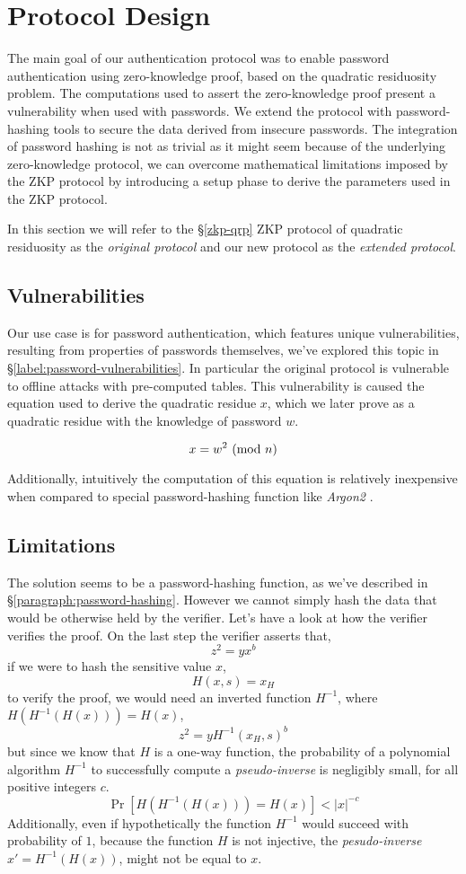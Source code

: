 \section{Protocol Design}
\label{label:protocol-design}
The main goal of our authentication protocol was to enable password authentication using zero-knowledge proof, based on the quadratic residuosity problem. 
The computations used to assert the zero-knowledge proof present a vulnerability when used with passwords.
We extend the protocol with password-hashing tools to secure the data derived from insecure passwords.
The integration of password hashing is not as trivial as it might seem because of the underlying zero-knowledge protocol, we can overcome mathematical limitations imposed by the ZKP protocol by introducing a setup phase to derive the parameters used in the ZKP protocol.

In this section we will refer to the \S\ref{zkp-qrp} ZKP protocol of quadratic residuosity as the \textit{original protocol}  and our new protocol as the \textit{extended protocol}.

\subsection{Vulnerabilities}
Our use case is for password authentication, which features unique vulnerabilities, resulting from properties of passwords themselves, we've explored this topic in \S \ref{label:password-vulnerabilities}.
In particular the original protocol is vulnerable to offline attacks with pre-computed tables.
This vulnerability is caused the equation used to derive the quadratic residue $x$, which we later prove as a quadratic residue with the knowledge of password $w$.

$$x = w^2 \ (\mathrm{mod}\ n)$$

Additionally, intuitively the computation of this equation is relatively inexpensive when compared to special password-hashing function like \textit{Argon2} \cite{biryukov2016argon2} .
\newpage
\subsection{Limitations}
The solution seems to be a password-hashing function, as we've described in \S\ref{paragraph:password-hashing}.
However we cannot simply hash the data that would be otherwise held by the verifier. 
Let's have a look at how the verifier verifies the proof.
On the last step the verifier asserts that,
$$ z^2 = yx^b$$
if we were to hash the sensitive value $x$,
$$H(x, s) = x_H$$
to verify the proof, we would need an inverted function $H^{-1}$, where $H(H^{-1}(H(x))) = H(x)$,
$$z^2 = yH^{-1}(x_H, s)^b$$
but since we know that $H$ is a one-way function, the probability of a polynomial algorithm $H^{-1}$ to successfully compute a \textit{pseudo-inverse} is negligibly small, for all positive integers $c$.
$$\Pr[H(H^{-1}(H(x))) = H(x)] < |x|^{-c}$$
Additionally, even if hypothetically the function $H^{-1}$ would succeed with probability of $1$, because the function $H$ is not injective, the \textit{pesudo-inverse} $x' = H^{-1}(H(x))$, might not be equal to $x$.


